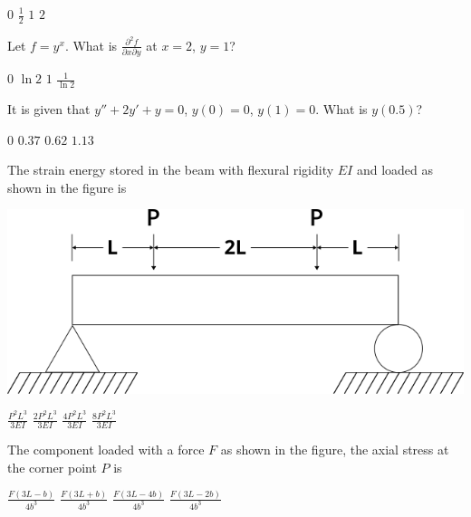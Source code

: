 \documentclass[addpoints,11pt]{exam}
\begin{document}
\begin{questions}
        \begin{oneparchoices}
            \choice $0$
            \choice $\frac{1}{2}$
            \choice $1$
            \choice $2$
        \end{oneparchoices}

        \question Let $f = y^x$. What is $\frac{\partial^2 f}{\partial{x}\partial{y}}$ at $x=2$, $y=1$?

        \begin{oneparchoices}
            \choice $0$
            \choice $\ln 2$
            \choice $1$
            \choice $\frac{1}{\ln 2}$
        \end{oneparchoices}

        \question It is given that $y'' + 2y' + y=0$, $y(0)=0$, $y(1)=0$. What is $y(0.5)$?

        \begin{oneparchoices}
            \choice $0$
            \choice $0.37$
            \choice $0.62$
            \choice $1.13$
        \end{oneparchoices}

        \question The strain energy stored in the beam with flexural rigidity $EI$ and loaded as shown in the figure is

        \begin{center}
            \includegraphics[scale=0.5]{q30}
        \end{center}

        \begin{oneparchoices}
            \choice $\frac{P^2L^3}{3EI}$
            \choice $\frac{2P^2L^3}{3EI}$
            \choice $\frac{4P^2L^3}{3EI}$
            \choice $\frac{8P^2L^3}{3EI}$
        \end{oneparchoices}

        \question The component loaded with a force $F$ as shown in the figure, the axial stress at the corner point $P$ is %

        \begin{oneparchoices}
            \choice $\frac{F(3L-b)}{4b^3}$
            \choice $\frac{F(3L+b)}{4b^3}$
            \choice $\frac{F(3L-4b)}{4b^3}$
            \choice $\frac{F(3L-2b)}{4b^3}$
        \end{oneparchoices}


\end{questions}
\end{document}
